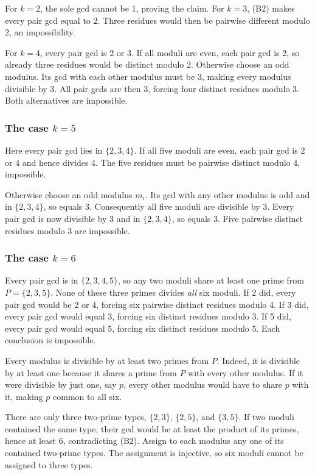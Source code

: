 \documentclass[11pt,a4paper]{article}
\begin{document}
For \(k=2\), the sole gcd cannot be 1, proving the claim. For \(k=3\), (B2) makes every pair gcd equal to 2. Three residues would then be pairwise different modulo 2, an impossibility.

For \(k=4\), every pair gcd is 2 or 3. If all moduli are even, each pair gcd is 2, so already three residues would be distinct modulo 2. Otherwise choose an odd modulus. Its gcd with each other modulus must be 3, making every modulus divisible by 3. All pair gcds are then 3, forcing four distinct residues modulo 3. Both alternatives are impossible.

\subsubsection{\texorpdfstring{The case \(k=5\)}{The case k=5}}\label{the-case-k5}

Here every pair gcd lies in \(\{2,3,4\}\). If all five moduli are even, each pair gcd is 2 or 4 and hence divides 4. The five residues must be pairwise distinct modulo 4, impossible.

Otherwise choose an odd modulus \(m_i\). Its gcd with any other modulus is odd and in \(\{2,3,4\}\), so equals 3. Consequently all five moduli are divisible by 3. Every pair gcd is now divisible by 3 and in \(\{2,3,4\}\), so equals 3. Five pairwise distinct residues modulo 3 are impossible.

\subsubsection{\texorpdfstring{The case \(k=6\)}{The case k=6}}\label{the-case-k6}

Every pair gcd is in \(\{2,3,4,5\}\), so any two moduli share at least one prime from \(P=\{2,3,5\}\). None of these three primes divides \emph{all} six moduli. If 2 did, every pair gcd would be 2 or 4, forcing six pairwise distinct residues modulo 4. If 3 did, every pair gcd would equal 3, forcing six distinct residues modulo 3. If 5 did, every pair gcd would equal 5, forcing six distinct residues modulo 5. Each conclusion is impossible.

Every modulus is divisible by at least two primes from \(P\). Indeed, it is divisible by at least one because it shares a prime from \(P\) with every other modulus. If it were divisible by just one, say \(p\), every other modulus would have to share \(p\) with it, making \(p\) common to all six.

There are only three two-prime types, \(\{2,3\}\), \(\{2,5\}\), and \(\{3,5\}\). If two moduli contained the same type, their gcd would be at least the product of its primes, hence at least 6, contradicting (B2). Assign to each modulus any one of its contained two-prime types. The assignment is injective, so six moduli cannot be assigned to three types.
\end{document}
